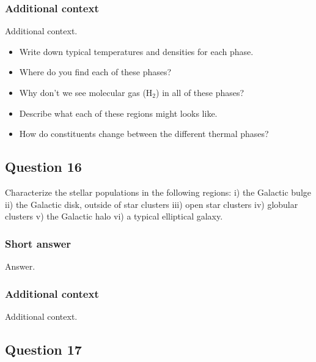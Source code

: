 \documentclass[a4paper,10pt]{article}
\begin{document}
\subsubsection{Additional context}

Additional context.

\begin{itemize}
    \item Write down typical temperatures and densities for each phase.
    \item Where do you find each of these phases?
    \item Why don't we see molecular gas (H$_2$) in all of these phases?
    \item Describe what each of these regions might looks like.
    \item How do constituents change between the different thermal phases?
\end{itemize}


\newpage
\subsection{Question 16}

Characterize the stellar populations in the following regions: i) the Galactic bulge ii) the Galactic disk, outside of star clusters iii) open star clusters iv) globular clusters v) the Galactic halo vi) a typical elliptical galaxy.

\subsubsection{Short answer}

Answer.

\subsubsection{Additional context}

Additional context.


\newpage
\subsection{Question 17}
\end{document}

